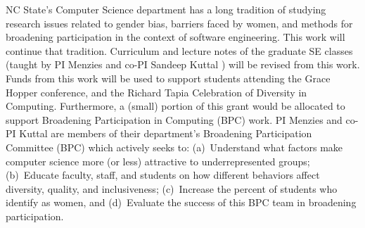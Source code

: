  NC  State’s  Computer  Science  department  has  a  long  tradition  of  studying research issues related to gender bias,  barriers faced by women, and methods for broadening participation    in  the  context  of  software  engineering. 
This work will continue that tradition.
Curriculum  and lecture notes of the graduate SE classes (taught by PI Menzies
and  co-PI Sandeep Kuttal ) will be revised from this work. Funds from this work will be used to support students attending the Grace Hopper conference, and the Richard Tapia Celebration  of Diversity in Computing. Furthermore,  a (small) portion of this grant would be allocated to support Broadening Participation in Computing (BPC) work.   PI  Menzies and  co-PI Kuttal are  members  of  their  department’s Broadening Participation Committee (BPC) which actively seeks to:  (a)~Understand what factors make computer science more (or less) attractive to underrepresented groups; (b)~Educate faculty, staff, and students on how different behaviors affect diversity, quality, and inclusiveness; (c)~Increase the percent of students who identify as women, and (d)~Evaluate the success of this BPC team in broadening participation.  